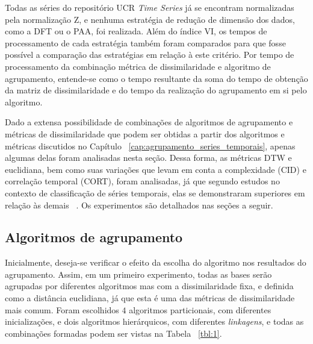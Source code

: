 Todas as séries do repositório UCR \emph{Time Series} já se encontram normalizadas pela normalização Z, e nenhuma estratégia de redução de dimensão dos dados, como a DFT ou o PAA, foi realizada. Além do índice VI, os tempos de processamento de cada estratégia também foram comparados para que fosse possível a comparação das estratégias em relação à este critério. Por tempo de processamento da combinação métrica de dissimilaridade e algoritmo de agrupamento, entende-se como o tempo resultante da soma do tempo de obtenção da matriz de dissimilaridade e do tempo da realização do agrupamento em si pelo algoritmo.

Dado a extensa possibilidade de combinações de algoritmos de agrupamento e métricas de dissimilaridade que podem ser obtidas a partir dos algoritmos e métricas discutidos no Capítulo ~\ref{cap:agrupamento_series_temporais}, apenas algumas delas foram analisadas nesta seção. Dessa forma, as métricas DTW e euclidiana, bem como suas variações que levam em conta a complexidade (CID) e correlação temporal (CORT), foram analisadas, já que segundo  estudos no contexto de classificação de séries temporais, elas se demonstraram superiores em relação às demais ~\parencite{BatistaComparativo}. Os experimentos são detalhados nas seções a seguir.

\subsection{Algoritmos de agrupamento} \label{sec:experimento_1}

Inicialmente, deseja-se verificar o efeito da escolha do algoritmo nos resultados do agrupamento. Assim, em um primeiro experimento, todas as bases serão agrupadas por diferentes algoritmos mas com a dissimilaridade fixa, e definida como a distância euclidiana, já que esta é uma das métricas de dissimilaridade mais comum. Foram escolhidos $4$ algoritmos particionais, com diferentes inicializações, e dois algoritmos hierárquicos, com diferentes \emph{linkagens}, e todas as combinações formadas podem ser vistas na Tabela ~\ref{tbl:1}.

